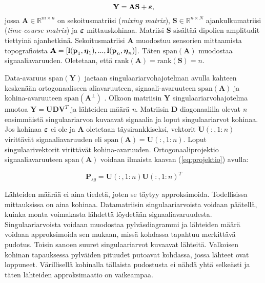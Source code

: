 \begin{equation}
    \mathbf{Y=AS+\text{\boldmath$\varepsilon$}},
\end{equation}
jossa $\mathbf{A}\in \mathbb{R}^{m\times n}$ on sekoitusmatriisi (\textit{mixing matrix}), $\mathbf{S}\in \mathbb{R}^{n\times N}$ ajankulkumatriisi (\textit{time-course matrix}) ja $\text{\boldmath$\varepsilon$}$ mittauskohinaa. Matriisi \textbf{S} sisältää dipolien amplitudit tiettyinä ajanhetkinä. Sekoitusmatriisi \textbf{A} muodostuu sensorien mittaamista topografioista $\mathbf{A} = [\mathbf{l(p}_1,\text{\boldmath$\eta$}_1),...,\mathbf{l(p}_n,\text{\boldmath$\eta$}_n)]$. Täten $\text{span}(\mathbf{A})$ muodostaa signaaliavaruuden. Oletetaan, että $\text{rank}(\mathbf{A}) = \text{rank}(\mathbf{S}) = n$.

Data-avaruus $\text{span}(\mathbf{Y})$ jaetaan singulaariarvohajotelman avulla kahteen keskenään ortogonaaliseen aliavaruuteen, signaali-avaruuteen $\text{span}(\mathbf{A})$  ja kohina-avaruuteen $\text{span}(\mathbf{A^\bot})$ \citep{Mosher1999SourceMUSIC}. Olkoon matriisin \textbf{Y} singulaariarvohajotelma muotoa $\mathbf{Y = UDV}^T$ ja lähteiden määrä \textit{n}. Matriisin \textbf{D} diagonaalilla olevat \textit{n} ensimmäistä singulaariarvoa kuvaavat signaalia ja loput singulaariarvot kohinaa. Jos kohinaa $\text{\boldmath$\varepsilon$}$ ei ole ja $\mathbf{A}$ oletetaan täysirankkiseksi, vektorit $\mathbf{U}(:,1:n)$ virittävät signaaliavaruuden eli $\text{span}(\mathbf{A}) = \mathbf{U}(:,1:n)$. Loput singulaarivektorit virittävät kohina-avaruuden. \citep{Mosher1999SourceMUSIC, Makela2018TruncatedLocalization} Ortogonaaliprojektio signaaliavaruuteen $\text{span}(\mathbf{A})$ voidaan ilmaista kaavan (\ref{eq:projektio}) avulla:

\begin{equation}
    \mathbf{P}_{sg}=\mathbf{U}(:,1:n)\mathbf{U}(:,1:n)^T
\end{equation} \citep{Makela2018TruncatedLocalization}

Lähteiden määrää ei aina tiedetä, joten se täytyy approksimoida. Todellisissa mittauksissa on aina kohinaa. Datamatriisin singulaariarvoista voidaan päätellä, kuinka monta voimakasta lähdettä löydetään signaaliavaruudesta. Singulaariarvoista voidaan muodostaa pylväsdiagrammi ja lähteiden määrä voidaan approksimoida sen mukaan, missä kohdassa tapahtuu merkittävä pudotus. Toisin sanoen suuret singulaariarvot kuvaavat lähteitä. Valkoisen kohinan tapauksessa pylväiden pituudet putoavat kohdassa, jossa lähteet ovat loppuneet. Värillisellä kohinalla tällaista pudostusta ei nähdä yhtä selkeästi ja täten lähteiden approksimaatio on vaikeampaa.


